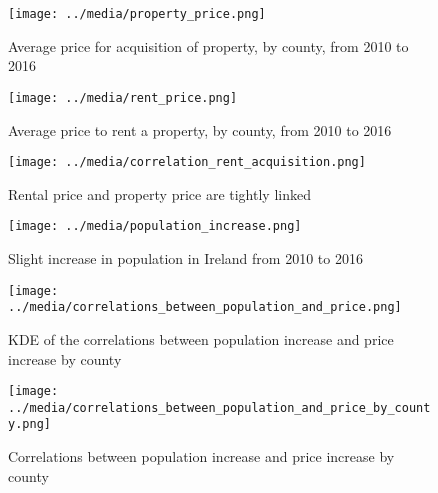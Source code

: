 \documentclass[twocolumn]{article}
\begin{document}
\begin{figure}[h]
	\centering
    \texttt{[image: ../media/property\_price.png]}
	\caption{Average price for acquisition of property, by county, from 2010 to 2016}
	\label{fig2}
\end{figure}

\begin{figure}[h]
	\centering
    \texttt{[image: ../media/rent\_price.png]}
	\caption{Average price to rent a property, by county, from 2010 to 2016}
	\label{fig3}
\end{figure}

\begin{figure}[h]
	\centering
    \texttt{[image: ../media/correlation\_rent\_acquisition.png]}
	\caption{Rental price and property price are tightly linked}
	\label{fig4}
\end{figure}

\begin{figure}[h]
	\centering
    \texttt{[image: ../media/population\_increase.png]}
	\caption{Slight increase in population in Ireland from 2010 to 2016}
	\label{fig5}
\end{figure}

\begin{figure}[h]
	\centering
    \texttt{[image: ../media/correlations\_between\_population\_and\_price.png]}
	\caption{KDE of the correlations between population increase and price increase by county}
	\label{fig6}
\end{figure}

\begin{figure}[h]
	\centering
    \texttt{[image: ../media/correlations\_between\_population\_and\_price\_by\_county.png]}
	\caption{Correlations between population increase and price increase by county}
	\label{fig7}
\end{figure}
\end{document}
